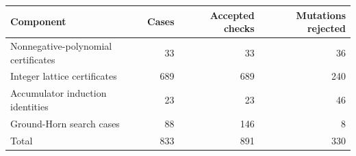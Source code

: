 \begin{tabular}{lrrr}
\toprule
Component & Cases & Accepted checks & Mutations rejected \\
\midrule
Nonnegative-polynomial certificates & 33 & 33 & 36 \\
Integer lattice certificates & 689 & 689 & 240 \\
Accumulator induction identities & 23 & 23 & 46 \\
Ground-Horn search cases & 88 & 146 & 8 \\
\midrule
Total & 833 & 891 & 330 \\
\bottomrule
\end{tabular}
